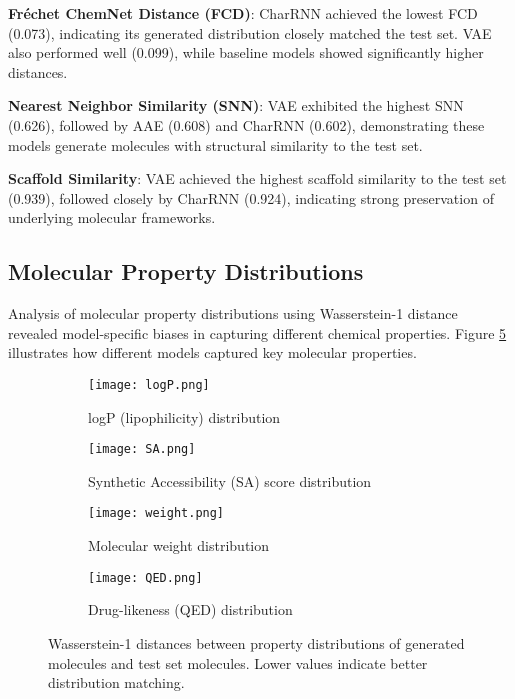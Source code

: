 \documentclass[conference]{IEEEtran}
\begin{document}
\textbf{Fréchet ChemNet Distance (FCD)}: CharRNN achieved the lowest FCD (0.073), indicating its generated distribution closely matched the test set. VAE also performed well (0.099), while baseline models showed significantly higher distances.

\textbf{Nearest Neighbor Similarity (SNN)}: VAE exhibited the highest SNN (0.626), followed by AAE (0.608) and CharRNN (0.602), demonstrating these models generate molecules with structural similarity to the test set.

\textbf{Scaffold Similarity}: VAE achieved the highest scaffold similarity to the test set (0.939), followed closely by CharRNN (0.924), indicating strong preservation of underlying molecular frameworks.

\subsection{Molecular Property Distributions}
Analysis of molecular property distributions using Wasserstein-1 distance revealed model-specific biases in capturing different chemical properties. Figure \ref{fig:property_dist} illustrates how different models captured key molecular properties.

\begin{figure}[htbp]
\centering
\begin{subfigure}{0.49\textwidth}
    \centering
    \texttt{[image: logP.png]}
    \caption{logP (lipophilicity) distribution}
    \label{fig:logP}
\end{subfigure}
\hfill
\begin{subfigure}{0.49\textwidth}
    \centering
    \texttt{[image: SA.png]}
    \caption{Synthetic Accessibility (SA) score distribution}
    \label{fig:SA}
\end{subfigure}
\vspace{0.5cm}

\begin{subfigure}{0.49\textwidth}
    \centering
    \texttt{[image: weight.png]}
    \caption{Molecular weight distribution}
    \label{fig:weight}
\end{subfigure}
\hfill
\begin{subfigure}{0.49\textwidth}
    \centering
    \texttt{[image: QED.png]}
    \caption{Drug-likeness (QED) distribution}
    \label{fig:QED}
\end{subfigure}
\caption{Wasserstein-1 distances between property distributions of generated molecules and test set molecules. Lower values indicate better distribution matching.}
\label{fig:property_dist}
\end{figure}
\end{document}
